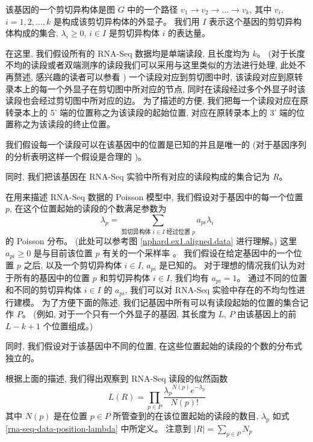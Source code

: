 该基因的一个剪切异构体是图 $G$ 中的一个路径 $v_1 \to v_2 \to \ldots \to v_k$, 
其中 $v_i$, $i=1,2,\ldots,k$ 是构成该剪切异构体的外显子。 
我们用 $I$ 表示这个基因的剪切异构体构成的集合, $\lambda_i \geq 0$, 
$i \in I$ 是剪切异构体 $i$ 的表达量。 

在这里, 我们假设所有的 RNA-Seq 数据均是单端读段, 且长度均为 $k$。 
(对于长度不均的读段或者双端测序的读段我们可以采用与这里类似的方法进行处理, 
此处不再赘述, 感兴趣的读者可以参看 ) 
一个读段对应到剪切图中时, 该读段对应到原转录本上的每一个外显子在剪切图中所对应的节点, 
同时在读段经过多个外显子时该读段也会经过剪切图中所对应的边。 
为了描述的方便, 我们把每一个读段对应在原转录本上的 5' 端的位置称之为该读段的起始位置, 
对应在原转录本上的 3' 端的位置称之为该读段的终止位置。 

我们假设每一个读段可以在该基因中的位置是已知的并且是唯一的 
(对于基因序列的分析表明这样一个假设是合理的 \cite{peng2011t})。 

同时, 我们把该基因在 RNA-Seq 实验中所有对应的读段构成的集合记为 $R$。 

在用来描述 RNA-Seq 数据的 Poisson 模型中, 
我们假设对于基因中的每一个位置 $p$, 
在这个位置起始的读段的个数满足参数为 
\begin{equation}
\label{rna-seq-data-position-lambda}
\lambda_p = \sum_{\text{剪切异构体 $i \in I$ 经过位置 $p$}} a_{pi} \lambda_i
\end{equation}
的 Poisson 分布。 (此处可以参考图 \ref{nphard.ex1.aligned.data} 进行理解。)
这里 $a_{pi} \geq 0$ 是与目前该位置 $p$ 有关的一个采样率 \cite{2011arXiv1106.3211S}。 
我们假设在给定基因中的一个位置 $p$ 之后, 以及一个剪切异构体 $i \in I$, 
$a_{pi}$ 是已知的。 
对于理想的情况我们认为对于所有的基因中的位置 $p$ 和剪切异构体 $i\in I$, 
我们均有 $a_{pi}=1$。 
通过不同的位置和不同的剪切异构体 $i\in I$ 的 $a_{pi}$, 
我们可以对 RNA-Seq 实验中存在的不均匀性进行建模。 
为了方便下面的陈述, 我们记基因中所有可以有读段起始的位置的集合记作 $P$。 
(例如, 对于一个只有一个外显子的基因, 其长度为 $L$, 
$P$ 由该基因上的前 $L-k+1$ 个位置组成。)

同时, 我们假设对于该基因中不同的位置, 
在这些位置起始的读段的个数的分布式独立的。 

根据上面的描述, 我们得出观察到 RNA-Seq 读段的似然函数
\begin{equation}
\label{rna-seq-data-poisson-likelihood}
L(R)= \prod_{p\in P} \frac{{\lambda_p}^{N(p)} e^{-\lambda_p}}{N(p)!}
\end{equation}
其中 $N(p)$ 是在位置 $p\in P$ 所管查到的在该位置起始的读段的数目, 
$\lambda_p$ 如式 \eqref{rna-seq-data-position-lambda} 中所定义。 
注意到 $|R|=\sum_{p\in P}N_p$

